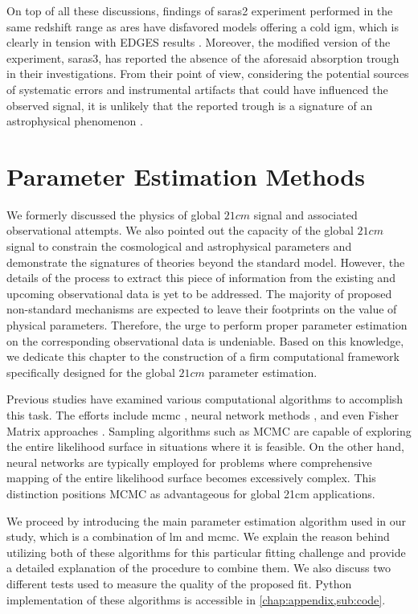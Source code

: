 \documentclass[12pt, TexShade, letterpaper]{report}
\begin{document}
 On top of all these discussions, findings of \gls{saras}2 experiment performed in the same redshift range as \gls{ares} have disfavored models offering a cold \gls{igm}, which is clearly in tension with EDGES results \cite{saras_2_constrains, saras_2_results}. Moreover, the modified version of the experiment, \gls{saras}3, has reported the absence of the aforesaid absorption trough in their investigations. From their point of view, considering the potential sources of systematic errors and instrumental artifacts that could have influenced the observed signal, it is unlikely that the reported trough is a signature of an astrophysical phenomenon \cite{saras_3_results, saras_curse_edges}.\par
\chapter{Parameter Estimation Methods}
\label{chap:method}
We formerly discussed the physics of global $21cm$ signal and associated observational attempts. We also pointed out the capacity of the global $21cm$ signal to constrain the cosmological and astrophysical parameters and demonstrate the signatures of theories beyond the standard model. However, the details of the process to extract this piece of information from the existing and upcoming observational data is yet to be addressed. The majority of proposed non-standard mechanisms are expected to leave their footprints on the value of physical parameters. Therefore, the urge to perform proper parameter estimation on the corresponding observational data is undeniable. Based on this knowledge, we dedicate this chapter to the construction of a firm computational framework specifically designed for the global $21cm$ parameter estimation. \par
Previous studies have examined various computational algorithms to accomplish this task. The efforts include \gls{mcmc} \cite{pe_mcmc_1, pe_mcmc_2}, neural network methods \cite{pe_nn_1}, and even Fisher Matrix approaches \cite{pe_fisher_1, pe_fisher_2}. Sampling algorithms such as MCMC are capable of exploring the entire likelihood surface in situations where it is feasible. On the other hand, neural networks are typically employed for problems where comprehensive mapping of the entire likelihood surface becomes excessively complex. This distinction positions MCMC as advantageous for global 21cm applications.\par
We proceed by introducing the main parameter estimation algorithm used in our study, which is a combination of \gls{lm} and \gls{mcmc}. We explain the reason behind utilizing both of these algorithms for this particular fitting challenge and provide a detailed explanation of the procedure to combine them. We also discuss two different tests used to measure the quality of the proposed fit. Python implementation of these algorithms is accessible in \ref{chap:appendix,sub:code}.
\end{document}
